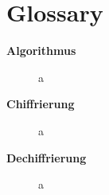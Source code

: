 {}
\renewcommand\refname{Glossary}
\section*{Glossary}




\begin{description}

  \item[\bf{Algorithmus}] a

  \item[\bf{Chiffrierung}] a

  \item[\bf{Dechiffrierung}] a

\end{description}

